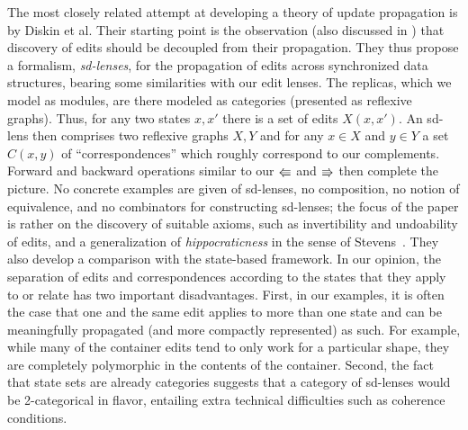 \newif \iftikz  \tikztrue
The most closely related attempt at developing a theory of update
propagation is \cite{Diskin-Delta11} by Diskin et al. Their starting
point is the observation (also discussed in \cite{Matching10}) that discovery of
edits should be decoupled from their propagation. They thus propose a
formalism, \emph{sd-lenses}, for the propagation of edits across
synchronized data structures, bearing some similarities with our
edit lenses. The replicas, which we model as modules, are there modeled
as categories (presented as reflexive graphs).
Thus, for any two states $x,x'$ there is a set of
edits $X(x,x')$. An sd-lens then comprises two reflexive graphs $X,Y$
and for any $x\in X$ and $y\in Y$ a set $C(x,y)$ of
``correspondences'' which roughly correspond to our
complements. Forward and backward operations similar to our $\mathord{\Lleftarrow}$ and
$\mathord{\Rrightarrow}$ then complete the picture. No concrete
examples are given of sd-lenses, no composition, no notion of equivalence, and
no combinators for constructing sd-lenses; the focus of the paper is
rather on the discovery of suitable axioms, such as invertibility and
undoability of edits, and a 
generalization of {\em hippocraticness} in the sense of
Stevens~\cite{Stevens07}. They also develop a comparison 
with the state-based framework. In
our opinion, the separation of edits and correspondences according to
the states that they apply to or relate has two important
disadvantages.  First, in our examples, it is often the case that one
and the same edit applies to more than one state and can be
meaningfully propagated (and more compactly represented) as such. For example, while many of the
container edits tend to only work for a particular shape, they are
completely polymorphic in the contents of the container. Second, the
fact that state sets are already categories suggests 
that a category of sd-lenses would be
2-categorical in flavor, entailing extra technical difficulties such as
coherence conditions. 

